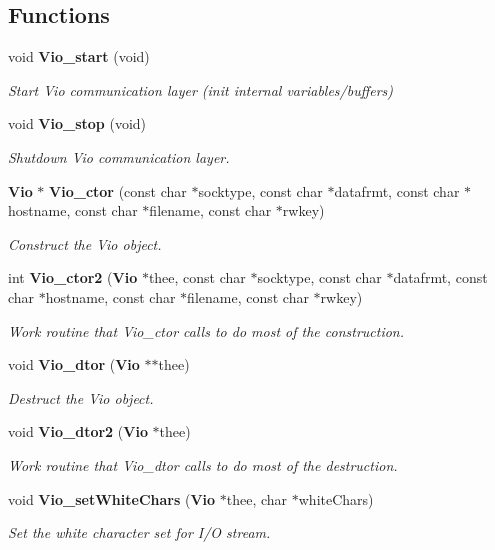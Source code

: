 \subsection*{Functions}
\begin{DoxyCompactItemize}
\item 
void {\bf Vio\-\_\-start} (void)
\begin{DoxyCompactList}\small\item\em Start Vio communication layer (init internal variables/buffers) \end{DoxyCompactList}\item 
void {\bf Vio\-\_\-stop} (void)
\begin{DoxyCompactList}\small\item\em Shutdown Vio communication layer. \end{DoxyCompactList}\item 
{\bf Vio} $\ast$ {\bf Vio\-\_\-ctor} (const char $\ast$socktype, const char $\ast$datafrmt, const char $\ast$hostname, const char $\ast$filename, const char $\ast$rwkey)
\begin{DoxyCompactList}\small\item\em Construct the Vio object. \end{DoxyCompactList}\item 
int {\bf Vio\-\_\-ctor2} ({\bf Vio} $\ast$thee, const char $\ast$socktype, const char $\ast$datafrmt, const char $\ast$hostname, const char $\ast$filename, const char $\ast$rwkey)
\begin{DoxyCompactList}\small\item\em Work routine that Vio\-\_\-ctor calls to do most of the construction. \end{DoxyCompactList}\item 
void {\bf Vio\-\_\-dtor} ({\bf Vio} $\ast$$\ast$thee)
\begin{DoxyCompactList}\small\item\em Destruct the Vio object. \end{DoxyCompactList}\item 
void {\bf Vio\-\_\-dtor2} ({\bf Vio} $\ast$thee)
\begin{DoxyCompactList}\small\item\em Work routine that Vio\-\_\-dtor calls to do most of the destruction. \end{DoxyCompactList}\item 
void {\bf Vio\-\_\-set\-White\-Chars} ({\bf Vio} $\ast$thee, char $\ast$white\-Chars)
\begin{DoxyCompactList}\small\item\em Set the white character set for I/\-O stream. \end{DoxyCompactList}\item 
$$
\end{DoxyCompactItemize}

